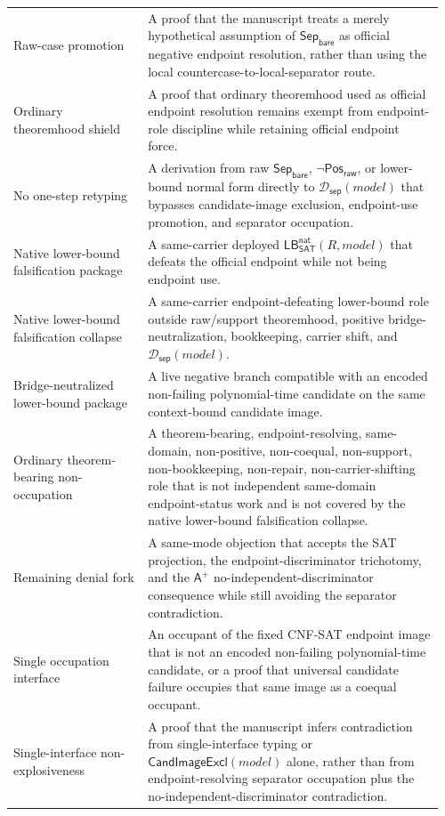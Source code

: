 \documentclass[11pt]{article}
\theoremstyle{definition}
\theoremstyle{remark}
\newcommand{\PosRaw}{\mathsf{Pos}_{\mathsf{raw}}}
\newcommand{\SepBare}{\mathsf{Sep}_{\mathsf{bare}}}
\newcommand{\Aplus}{\mathsf{A}^{+}}
\newcommand{\SepDisc}{\mathcal{D}_{\mathsf{sep}}}
\newcommand{\CandImageExcl}{\mathsf{CandImageExcl}}
\newcommand{\LBNatSAT}{\mathsf{LB}^{\mathsf{nat}}_{\mathsf{SAT}}}
\begin{document}
{\begin{longtable}{@{}>{\raggedright\arraybackslash}p{0.30\linewidth}>{\raggedright\arraybackslash}p{0.66\linewidth}@{}}
Raw-case promotion & A proof that the manuscript treats a merely hypothetical assumption of \(\SepBare\) as official negative endpoint resolution, rather than using the local countercase-to-local-separator route. \\
Ordinary theoremhood shield & A proof that ordinary theoremhood used as official endpoint resolution remains exempt from endpoint-role discipline while retaining official endpoint force. \\
No one-step retyping & A derivation from raw \(\SepBare\), \(\neg\PosRaw\), or lower-bound normal form directly to \(\SepDisc(model)\) that bypasses candidate-image exclusion, endpoint-use promotion, and separator occupation. \\
Native lower-bound falsification package & A same-carrier deployed \(\LBNatSAT(R,model)\) that defeats the official endpoint while not being endpoint use. \\
Native lower-bound falsification collapse & A same-carrier endpoint-defeating lower-bound role outside raw/support theoremhood, positive bridge-neutralization, bookkeeping, carrier shift, and \(\SepDisc(model)\). \\
Bridge-neutralized lower-bound package & A live negative branch compatible with an encoded non-failing polynomial-time candidate on the same context-bound candidate image. \\
Ordinary theorem-bearing non-occupation & A theorem-bearing, endpoint-resolving, same-domain, non-positive, non-coequal, non-support, non-bookkeeping, non-repair, non-carrier-shifting role that is not independent same-domain endpoint-status work and is not covered by the native lower-bound falsification collapse. \\
Remaining denial fork & A same-mode objection that accepts the SAT projection, the endpoint-discriminator trichotomy, and the \(\Aplus\) no-independent-discriminator consequence while still avoiding the separator contradiction. \\
Single occupation interface & An occupant of the fixed CNF-SAT endpoint image that is not an encoded non-failing polynomial-time candidate, or a proof that universal candidate failure occupies that same image as a coequal occupant. \\
Single-interface non-explosiveness & A proof that the manuscript infers contradiction from single-interface typing or \(\CandImageExcl(model)\) alone, rather than from endpoint-resolving separator occupation plus the no-independent-discriminator contradiction. \\

\end{longtable}}
\end{document}

